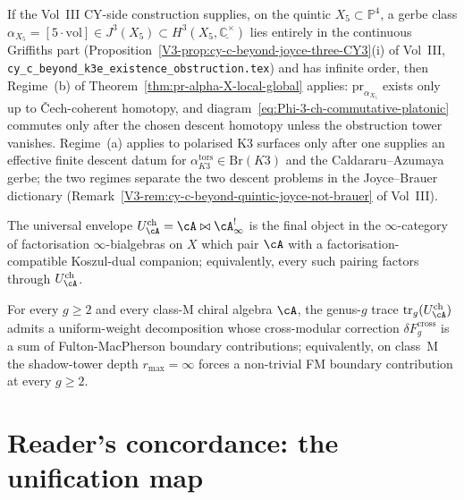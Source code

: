 \begin{remark}
\label{rem:pr-alpha-X-quintic}
If the Vol~III CY-side construction supplies, on the quintic
$X_5 \subset \mathbb{P}^4$, a gerbe class
$\alpha_{X_5} = [5 \cdot \mathrm{vol}] \in J^3(X_5) \subset
H^3(X_5, \underline{\mathbb{C}^\times})$ lies entirely in the
continuous Griffiths part
(Proposition~\ref{V3-prop:cy-c-beyond-joyce-three-CY3}(i) of
Vol~III, \texttt{cy\_c\_beyond\_k3e\_existence\_obstruction.tex})
and has infinite order, then Regime~(b) of
Theorem~\ref{thm:pr-alpha-X-local-global} applies:
$\mathrm{pr}_{\alpha_{X_5}}$ exists only up to Čech-coherent
homotopy, and diagram~\eqref{eq:Phi-3-ch-commutative-platonic}
commutes only after the chosen descent homotopy unless the obstruction
tower vanishes. Regime~(a) applies to polarised K3 surfaces only after
one supplies an effective finite descent datum for
$\alpha_{K3}^{\mathrm{tors}} \in
\mathrm{Br}(K3)$ and the Caldararu--Azumaya gerbe; the two regimes
separate the two descent problems in the Joyce--Brauer dictionary
(Remark~\ref{V3-rem:cy-c-beyond-quintic-joyce-not-brauer} of
Vol~III).
\end{remark}

\begin{conjecture}
\label{conj:universal-envelope-ambient-platonic}
\ClaimStatusConjectured
The universal envelope $\Uch_\cA = \cA \bowtie \cA^!_\infty$ is
the final object in the $\infty$-category of factorisation
$\infty$-bialgebras on $X$ which pair $\cA$ with a
factorisation-compatible Koszul-dual companion; equivalently,
every such pairing factors through $\Uch_\cA$.
\end{conjecture}

\begin{conjecture}
\label{conj:genus-g-universality-platonic}
\ClaimStatusConjectured
For every $g \geq 2$ and every class-M chiral algebra $\cA$, the
genus-$g$ trace $\trgenus(\Uch_\cA)$ admits a uniform-weight
decomposition whose cross-modular correction
$\delta F_g^{\mathrm{cross}}$ is a sum of
Fulton-MacPherson boundary contributions; equivalently, on
class~M the shadow-tower depth $r_{\max} = \infty$ forces a
non-trivial FM boundary contribution at every $g \geq 2$.
\end{conjecture}

\section{Reader's concordance: the unification map}
\label{sec:grand-theorem-concordance}

